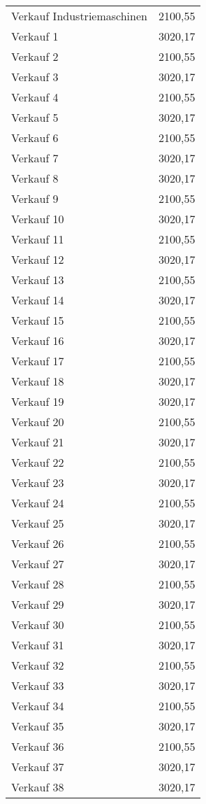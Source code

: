 \begin{center}%
\begin{supertabular}{ | l | r |}
Verkauf Industriemaschinen & 2100,55 \\
Verkauf 1 & 3020,17 \\
Verkauf 2 & 2100,55 \\
Verkauf 3 & 3020,17 \\
Verkauf 4 & 2100,55 \\
Verkauf 5 & 3020,17 \\
Verkauf 6 & 2100,55 \\
Verkauf 7 & 3020,17 \\
Verkauf 8 & 3020,17 \\
Verkauf 9 & 2100,55 \\
Verkauf 10 & 3020,17 \\
Verkauf 11 & 2100,55 \\
Verkauf 12 & 3020,17 \\
Verkauf 13 & 2100,55 \\
Verkauf 14 & 3020,17 \\
Verkauf 15 & 2100,55 \\
Verkauf 16 & 3020,17 \\
Verkauf 17 & 2100,55 \\
Verkauf 18 & 3020,17 \\
Verkauf 19 & 3020,17 \\
Verkauf 20 & 2100,55 \\
Verkauf 21 & 3020,17 \\
Verkauf 22 & 2100,55 \\
Verkauf 23 & 3020,17 \\
Verkauf 24 & 2100,55 \\
Verkauf 25 & 3020,17 \\
Verkauf 26 & 2100,55 \\
Verkauf 27 & 3020,17 \\
Verkauf 28 & 2100,55 \\
Verkauf 29 & 3020,17 \\
Verkauf 30 & 2100,55 \\
Verkauf 31 & 3020,17 \\
Verkauf 32 & 2100,55 \\
Verkauf 33 & 3020,17 \\
Verkauf 34 & 2100,55 \\
Verkauf 35 & 3020,17 \\
Verkauf 36 & 2100,55 \\
Verkauf 37 & 3020,17 \\
Verkauf 38 & 3020,17 \\

\end{supertabular}
\end{center}
